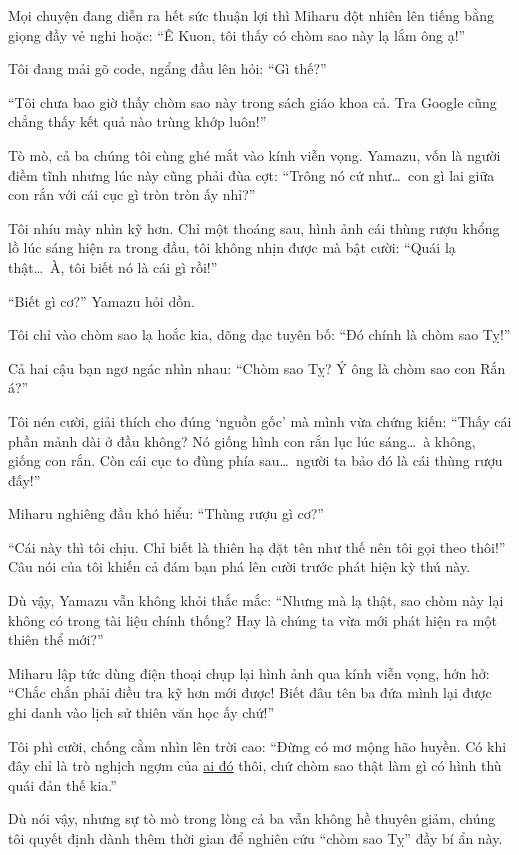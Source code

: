 \documentclass[../main.tex]{subfiles}
\begin{document}
Mọi chuyện đang diễn ra hết sức thuận lợi thì Miharu đột nhiên lên tiếng bằng giọng đầy vẻ nghi hoặc: ``Ê Kuon, tôi thấy có chòm sao này lạ lắm ông ạ!''

Tôi đang mải gõ code, ngẩng đầu lên hỏi: ``Gì thế?''

``Tôi chưa bao giờ thấy chòm sao này trong sách giáo khoa cả. Tra Google cũng chẳng thấy kết quả nào trùng khớp luôn!''

Tò mò, cả ba chúng tôi cùng ghé mắt vào kính viễn vọng. Yamazu, vốn là người điềm tĩnh nhưng lúc này cũng phải đùa cợt: ``Trông nó cứ như\dots\ con gì lai giữa con rắn với cái cục gì tròn tròn ấy nhỉ?''


Tôi nhíu mày nhìn kỹ hơn. Chỉ một thoáng sau, hình ảnh cái thùng rượu khổng lồ lúc sáng hiện ra trong đầu, tôi không nhịn được mà bật cười: ``Quái lạ thật\dots\ À, tôi biết nó là cái gì rồi!''

``Biết gì cơ?'' Yamazu hỏi dồn.

Tôi chỉ vào chòm sao lạ hoắc kia, dõng dạc tuyên bố: ``Đó chính là chòm sao Tỵ!''

Cả hai cậu bạn ngơ ngác nhìn nhau: ``Chòm sao Tỵ? Ý ông là chòm sao con Rắn á?''

Tôi nén cười, giải thích cho đúng `nguồn gốc' mà mình vừa chứng kiến: ``Thấy cái phần mảnh dài ở đầu không? Nó giống hình con rắn lục lúc sáng\dots\ à không, giống con rắn. Còn cái cục to đùng phía sau\dots\ người ta bảo đó là cái thùng rượu đấy!''

Miharu nghiêng đầu khó hiểu: ``Thùng rượu gì cơ?''

``Cái này thì tôi chịu. Chỉ biết là thiên hạ đặt tên như thế nên tôi gọi theo thôi!'' Câu nói của tôi khiến cả đám bạn phá lên cười trước phát hiện kỳ thú này.

Dù vậy, Yamazu vẫn không khỏi thắc mắc: ``Nhưng mà lạ thật, sao chòm này lại không có trong tài liệu chính thống? Hay là chúng ta vừa mới phát hiện ra một thiên thể mới?''

Miharu lập tức dùng điện thoại chụp lại hình ảnh qua kính viễn vọng, hớn hở: ``Chắc chắn phải điều tra kỹ hơn mới được! Biết đâu tên ba đứa mình lại được ghi danh vào lịch sử thiên văn học ấy chứ!''

Tôi phì cười, chống cằm nhìn lên trời cao: ``Đừng có mơ mộng hão huyền. Có khi đây chỉ là trò nghịch ngợm của \uline{ai đó} thôi, chứ chòm sao thật làm gì có hình thù quái đản thế kia.''

Dù nói vậy, nhưng sự tò mò trong lòng cả ba vẫn không hề thuyên giảm, chúng tôi quyết định dành thêm thời gian để nghiên cứu ``chòm sao Tỵ'' đầy bí ẩn này.
\end{document}
